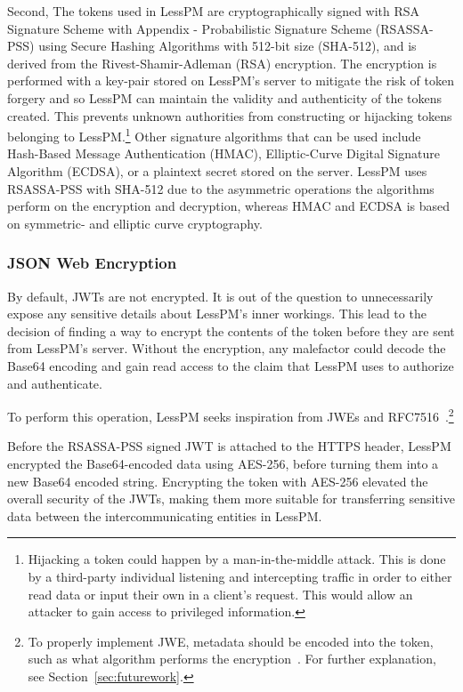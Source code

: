 Second, The tokens used in LessPM are cryptographically signed with RSA
Signature Scheme with Appendix - Probabilistic Signature Scheme (RSASSA-PSS)
using Secure Hashing Algorithms with 512-bit size (SHA-512), and is derived
from the Rivest-Shamir-Adleman (RSA) encryption.
The encryption is performed with a key-pair stored on LessPM's server to
mitigate the risk of token forgery and so LessPM can maintain the validity and
authenticity of the tokens created.
This prevents unknown authorities from constructing or hijacking tokens
belonging to LessPM\@.\footnote{
  Hijacking a token could happen by a man-in-the-middle attack.
  This is done by a third-party individual listening and intercepting traffic
  in order to either read data or input their own in a client's request.
  This would allow an attacker to gain access to privileged information.
}
Other signature algorithms that can be used include Hash-Based Message
Authentication (HMAC), Elliptic-Curve Digital Signature Algorithm (ECDSA), or
a plaintext secret stored on the server.
LessPM uses RSASSA-PSS with SHA-512 due to the asymmetric operations the
algorithms perform on the encryption and decryption, whereas HMAC and ECDSA is
based on symmetric- and elliptic curve cryptography.

\subsubsection{JSON Web Encryption}
By default, JWTs are not encrypted.
It is out of the question to unnecessarily expose any sensitive details about
LessPM's inner workings.
This lead to the decision of finding a way to encrypt the contents of the 
token before they are sent from LessPM's server.
Without the encryption, any malefactor could decode the Base64 encoding and
gain read access to the claim that LessPM uses to authorize and authenticate.

To perform this operation, LessPM seeks inspiration from JWEs and
RFC7516~\cite{rfc7516}.\footnote{
  To properly implement JWE, metadata should be encoded into the token, such as
  what algorithm performs the encryption~\cite{rfc7516}. For further
  explanation, see Section~\ref{sec:futurework}.
}

Before the RSASSA-PSS signed JWT is attached to the HTTPS header,
LessPM encrypted the Base64-encoded data using AES-256, before turning them into
a new Base64 encoded string.
Encrypting the token with AES-256 elevated the overall security of the
JWTs, making them more suitable for transferring sensitive data between the
intercommunicating entities in LessPM\@.

